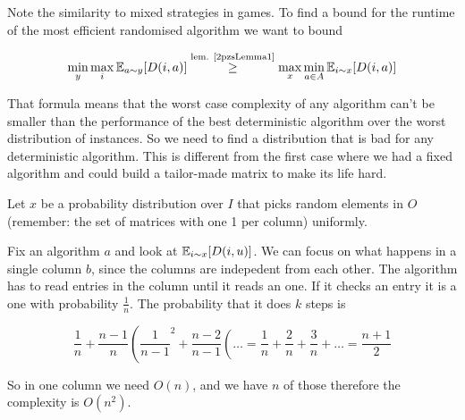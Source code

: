 Note the similarity to mixed strategies in games. To find a bound for the runtime of the most efficient randomised algorithm we want to bound 

\[\min_y \max_i \mathbb{E}_{a\sim y}[D(i,a)] \stackrel{\text{lem. \ref{2pzsLemma1}}}{\geq} \max_x\min_{a\in A} \mathbb{E}_{i\sim x}[D(i,a)]\]

That formula means that the worst case complexity of any algorithm can't be smaller than the performance of the best deterministic algorithm over the worst distribution of instances. So we need to find a distribution that is bad for any deterministic algorithm. This is different from the first case where we had a fixed algorithm and could build a tailor-made matrix to make its life hard.

Let $x$ be a probability distribution over $I$ that picks random elements in $O$ (remember: the set of matrices with one 1 per column) uniformly.

Fix an algorithm $a$ and look at $\mathbb{E}_{i\sim x}[D(i,u)]$. We can focus on what happens in a single column $b$, since the columns are indepedent from each other. The algorithm has to read entries in the column until it reads an one. If it checks an entry it is a one with probability $\frac{1}{n}$. The probability that it does $k$ steps is

\[\frac{1}{n} + \frac{n-1}{n}\left( \frac{1}{n-1}^2+\frac{n-2}{n-1}\left(\ldots = \frac{1}{n} + \frac 2n + \frac 3n + \right.\right.\ldots= \frac{n+1}{2}\]

So in one column we need $O(n)$, and we have $n$ of those therefore the complexity is $O(n^2)$.

